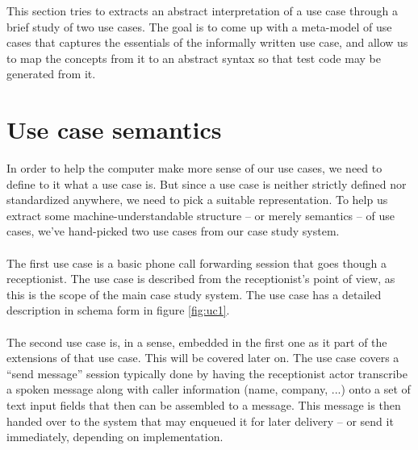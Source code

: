 
This section tries to extracts an abstract interpretation of a use case through a brief study of two use cases. The goal is to come up with a meta-model of use cases that captures the essentials of the informally written use case, and allow us to map the concepts from it to an abstract syntax so that test code may be generated from it.
\section{Use case semantics}
In order to help the computer make more sense of our use cases, we need to define to it what a use case is. But since a use case is neither strictly defined nor standardized anywhere, we need to pick a suitable representation.
To help us extract some machine-understandable structure -- or merely semantics -- of use cases, we've hand-picked two use cases from our case study system.\\\\
The first use case is a basic phone call forwarding session that goes though a receptionist. The use case is described from the receptionist's point of view, as this is the scope of the main case study system. The use case has a detailed description in schema form in figure \ref{fig:uc1}. \\\\
The second use case is, in a sense, embedded in the first one as it part of the extensions of that use case. This will be covered later on. The use case covers a ``send message'' session typically done by having the receptionist actor transcribe a spoken message along with caller information (name, company, ...) onto a set of text input fields that then can be assembled to a message. This message is then handed over to the system that may enqueued it for later delivery -- or send it immediately, depending on implementation.

